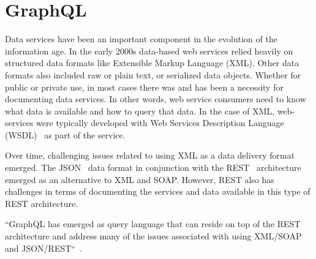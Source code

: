 \section{GraphQL}

Data services have been an important component in the evolution of the
information age.  In the early 2000s data-based web services relied
heavily on structured data formats like Extensible Markup
Language (XML).  Other data formats also included raw or plain text, or
serialized data objects.  Whether for public or private use, in most
cases there was and has been a necessity for documenting data
services.  In other words, web service consumers need to know what
data is available and how to query that data.  In the case of XML,
web-services were typically developed with
Web Services Description Language (WSDL)~\cite{hid-sp18-505-WSDL2018} as part
of the service.

Over time, challenging issues related to using XML as a data delivery format
emerged.  The JSON~\cite{hid-sp18-505-JSON2018} data format in
conjunction with the REST~\cite{hid-sp18-505-REST2018} architecture emerged
as an alternative to XML and SOAP.  However, REST also has challenges in terms
of documenting the services and data available in this type of REST
architecture.

``GraphQL has emerged as query language that can reside on top of the REST
architecture and address many of the issues associated with using XML/SOAP and
JSON/REST``~\cite{hid-sp18-505-GraphQL2018}.
